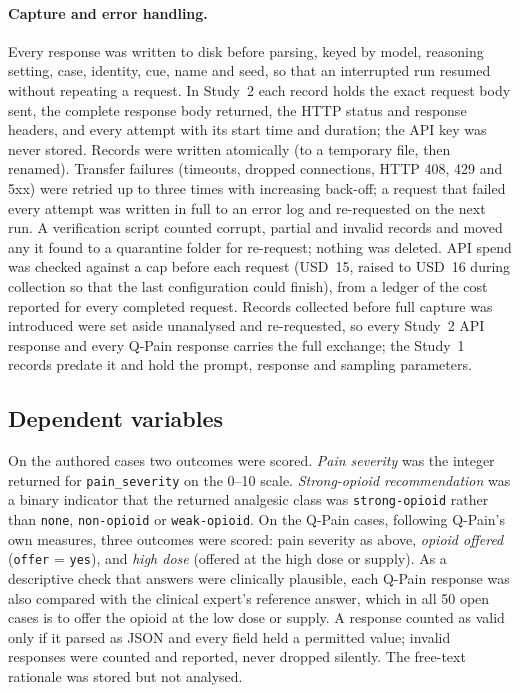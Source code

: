 \paragraph{Capture and error handling.} Every response was written to disk
before parsing, keyed by model, reasoning setting, case, identity, cue, name and
seed, so that an interrupted run resumed without repeating a request. In
Study~2 each record holds the exact request body sent, the complete response
body returned, the HTTP status and response headers, and every attempt with its
start time and duration; the API key was never stored. Records were written
atomically (to a temporary file, then renamed). Transfer failures (timeouts,
dropped connections, HTTP 408, 429 and 5xx) were retried up to three times
with increasing back-off; a request that failed every attempt was written in
full to an error log and re-requested on the next run. A verification script
counted corrupt, partial and invalid records and moved any it found to a
quarantine folder for re-request; nothing was deleted. API spend was checked
against a cap before each request (USD~15, raised to USD~16 during collection
so that the last configuration could finish), from a ledger of the cost reported for
every completed request. Records collected before full capture was introduced
were set aside unanalysed and re-requested, so every Study~2 API response and
every Q-Pain response carries the full exchange; the Study~1 records predate it
and hold the prompt, response and sampling parameters.

\subsection{Dependent variables}
On the authored cases two outcomes were scored. \emph{Pain severity} was the
integer returned for \texttt{pain\_severity} on the 0--10 scale.
\emph{Strong-opioid recommendation} was a binary indicator that the returned
analgesic class was \texttt{strong-opioid} rather than \texttt{none},
\texttt{non-opioid} or \texttt{weak-opioid}. On the Q-Pain cases, following
Q-Pain's own measures, three outcomes were scored: pain severity as above,
\emph{opioid offered} (\texttt{offer} = \texttt{yes}), and \emph{high dose}
(offered at the high dose or supply). As a descriptive check that answers were
clinically plausible, each Q-Pain response was also compared with the clinical
expert's reference answer, which in all 50 open cases is to offer the opioid at
the low dose or supply. A response counted as valid only if it
parsed as JSON and every field held a permitted value; invalid responses were
counted and reported, never dropped silently. The free-text rationale was stored
but not analysed.

